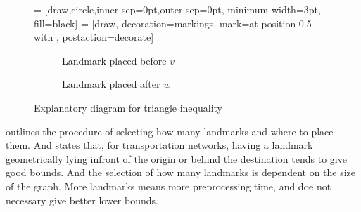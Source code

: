 \begin{figure}[H]
    \centering
     = [draw,circle,inner sep=0pt,outer sep=0pt, minimum width=3pt, fill=black]
     = [draw, decoration={markings, mark=at position 0.5 with {\arrow{>}}}, postaction={decorate}]
    \begin{subfigure}[t]{.4\textwidth}
        \centering
        \caption{Landmark placed before $v$}
    \end{subfigure}
    \hspace{1cm}
    \begin{subfigure}[t]{.4\textwidth}
        \centering
        \caption{Landmark placed after $w$}
    \end{subfigure}
    \caption{Explanatory diagram for triangle inequality}
\end{figure}

\citet{GoldbergLandmarks} outlines the procedure of selecting how many landmarks and where to place them.
And states that, for transportation networks,
having a landmark geometrically lying infront of the origin or behind the destination tends to give good bounds.
And the selection of how many landmarks is dependent on the size of the graph.
More landmarks means more preprocessing time, 
and doe not necessary give better lower bounds.


